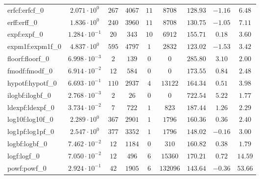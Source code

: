 \begin{tabular}{|l|c|c|c|c|c|c|c|c|}
erfcf:erfcf\_0               & $ 2.071 \cdot 10^{0}  $ & $ 267    $ & $ 4067   $ & $ 11  $ & $ 8708   $ & $ 128.93      $ & $ -1.16   $ & $ 6.48    $ \\
erff:erff\_0                 & $ 1.836 \cdot 10^{0}  $ & $ 240    $ & $ 3960   $ & $ 11  $ & $ 8708   $ & $ 130.75      $ & $ -1.05   $ & $ 7.11    $ \\
expf:expf\_0                 & $ 1.284 \cdot 10^{-1} $ & $ 20     $ & $ 343    $ & $ 10  $ & $ 6912   $ & $ 155.71      $ & $ 0.18    $ & $ 3.60    $ \\
expm1f:expm1f\_0             & $ 4.837 \cdot 10^{0}  $ & $ 595    $ & $ 4797   $ & $ 1   $ & $ 2832   $ & $ 123.02      $ & $ -1.53   $ & $ 3.42    $ \\
floorf:floorf\_0             & $ 6.998 \cdot 10^{-3} $ & $ 2      $ & $ 139    $ & $ 0   $ & $ 0      $ & $ 285.80      $ & $ 3.10    $ & $ 2.00    $ \\
fmodf:fmodf\_0               & $ 6.914 \cdot 10^{-2} $ & $ 12     $ & $ 584    $ & $ 0   $ & $ 0      $ & $ 173.55      $ & $ 0.84    $ & $ 2.48    $ \\
hypotf:hypotf\_0             & $ 6.693 \cdot 10^{-1} $ & $ 110    $ & $ 2937   $ & $ 4   $ & $ 13122  $ & $ 164.34      $ & $ 0.51    $ & $ 3.98    $ \\
ilogbf:ilogbf\_0             & $ 2.768 \cdot 10^{-3} $ & $ 2      $ & $ 26     $ & $ 0   $ & $ 0      $ & $ 722.54      $ & $ 5.22    $ & $ 1.77    $ \\
ldexpf:ldexpf\_0             & $ 3.734 \cdot 10^{-2} $ & $ 7      $ & $ 722    $ & $ 1   $ & $ 823    $ & $ 187.44      $ & $ 1.26    $ & $ 2.29    $ \\
log10f:log10f\_0             & $ 2.289 \cdot 10^{0}  $ & $ 367    $ & $ 2901   $ & $ 1   $ & $ 1796   $ & $ 160.36      $ & $ 0.36    $ & $ 2.40    $ \\
log1pf:log1pf\_0             & $ 2.547 \cdot 10^{0}  $ & $ 377    $ & $ 3352   $ & $ 1   $ & $ 1796   $ & $ 148.02      $ & $ -0.16   $ & $ 3.00    $ \\
logbf:logbf\_0               & $ 7.462 \cdot 10^{-2} $ & $ 12     $ & $ 1184   $ & $ 0   $ & $ 310    $ & $ 160.82      $ & $ 0.38    $ & $ 1.79    $ \\
logf:logf\_0                 & $ 7.050 \cdot 10^{-2} $ & $ 12     $ & $ 496    $ & $ 6   $ & $ 15360  $ & $ 170.21      $ & $ 0.72    $ & $ 14.59   $ \\
powf:powf\_0                 & $ 2.924 \cdot 10^{-1} $ & $ 42     $ & $ 1905   $ & $ 6   $ & $ 132096 $ & $ 143.64      $ & $ -0.36   $ & $ 53.66   $ \\

\end{tabular}
